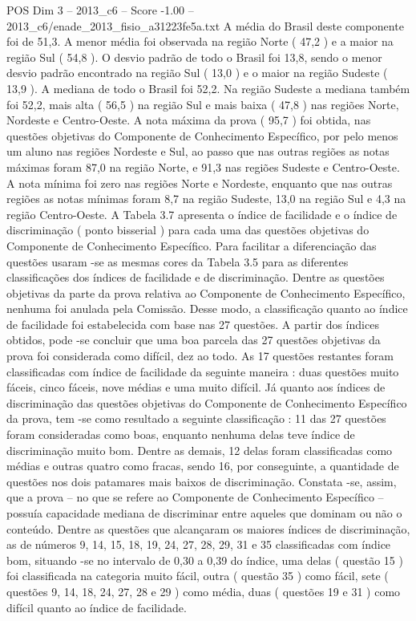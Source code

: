 \begin{textsample}{POS Dim 3 – 2013\_c6 – Score -1.00 – 2013\_c6/enade\_2013\_fisio\_a31223fe5a.txt}
A média do Brasil deste componente foi de 51,3.
A menor média foi observada na região Norte ( 47,2 ) e a maior na região Sul ( 54,8 ).
O desvio padrão de todo o Brasil foi 13,8, sendo o menor desvio padrão encontrado na região Sul ( 13,0 ) e o maior na região Sudeste ( 13,9 ).
A mediana de todo o Brasil foi 52,2.
Na região Sudeste a mediana também foi 52,2, mais alta ( 56,5 ) na região Sul e mais baixa ( 47,8 ) nas regiões Norte, Nordeste e Centro-Oeste.
A nota máxima da prova ( 95,7 ) foi obtida, nas questões objetivas do Componente de Conhecimento Específico, por pelo menos um aluno nas regiões Nordeste e Sul, ao passo que nas outras regiões as notas máximas foram 87,0 na região Norte, e 91,3 nas regiões Sudeste e Centro-Oeste.
A nota mínima foi zero nas regiões Norte e Nordeste, enquanto que nas outras regiões as notas mínimas foram 8,7 na região Sudeste, 13,0 na região Sul e 4,3 na região Centro-Oeste.
A Tabela 3.7 apresenta o índice de facilidade e o índice de discriminação ( ponto bisserial ) para cada uma das questões objetivas do Componente de Conhecimento Específico.
Para facilitar a diferenciação das questões usaram -se as mesmas cores da Tabela 3.5 para as diferentes classificações dos índices de facilidade e de discriminação.
Dentre as questões objetivas da parte da prova relativa ao Componente de Conhecimento Específico, nenhuma foi anulada pela Comissão.
Desse modo, a classificação quanto ao índice de facilidade foi estabelecida com base nas 27 questões.
A partir dos índices obtidos, pode -se concluir que uma boa parcela das 27 questões objetivas da prova foi considerada como difícil, dez ao todo.
As 17 questões restantes foram classificadas com índice de facilidade da seguinte maneira : duas questões muito fáceis, cinco fáceis, nove médias e uma muito difícil.
Já quanto aos índices de discriminação das questões objetivas do Componente de Conhecimento Específico da prova, tem -se como resultado a seguinte classificação : 11 das 27 questões foram consideradas como boas, enquanto nenhuma delas teve índice de discriminação muito bom.
Dentre as demais, 12 delas foram classificadas como médias e outras quatro como fracas, sendo 16, por conseguinte, a quantidade de questões nos dois patamares mais baixos de discriminação.
Constata -se, assim, que a prova – no que se refere ao Componente de Conhecimento Específico – possuía capacidade mediana de discriminar entre aqueles que dominam ou não o conteúdo.
Dentre as questões que alcançaram os maiores índices de discriminação, as de números 9, 14, 15, 18, 19, 24, 27, 28, 29, 31 e 35 classificadas com índice bom, situando -se no intervalo de 0,30 a 0,39 do índice, uma delas ( questão 15 ) foi classificada na categoria muito fácil, outra ( questão 35 ) como fácil, sete ( questões 9, 14, 18, 24, 27, 28 e 29 ) como média, duas ( questões 19 e 31 ) como difícil quanto ao índice de facilidade.

\end{textsample}

